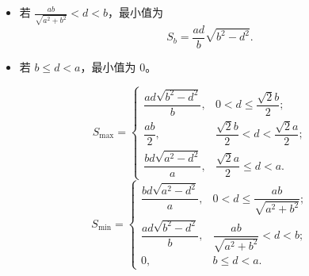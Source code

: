 \begin{solution}
\begin{itemize}
$$S_a = \frac{bd}{a}\sqrt{a^2 - d^2}.$$
\item 若 $\frac{ab}{\sqrt{a^2+b^2}} < d < b$，最小值为
$$S_b = \frac{ad}{b}\sqrt{b^2 - d^2}.$$
\item 若 $b \leq d < a$，最小值为 $0$。
\end{itemize}
    $$S_{\max} = \begin{cases} \dfrac{ad\sqrt{b^2 - d^2}}{b}, & 0 < d \leq \dfrac{\sqrt{2}b}{2}; \\ \dfrac{ab}{2}, & \dfrac{\sqrt{2}b}{2} < d < \dfrac{\sqrt{2}a}{2}; \\ \dfrac{bd\sqrt{a^2 - d^2}}{a}, & \dfrac{\sqrt{2}a}{2} \leq d < a. \end{cases}$$
$$S_{\min} = \begin{cases} \dfrac{bd\sqrt{a^2 - d^2}}{a}, & 0 < d \leq \dfrac{ab}{\sqrt{a^2 + b^2}}; \\ \dfrac{ad\sqrt{b^2 - d^2}}{b}, & \dfrac{ab}{\sqrt{a^2 + b^2}} < d < b; \\ 0, & b \leq d < a. \end{cases}$$
\end{solution}

